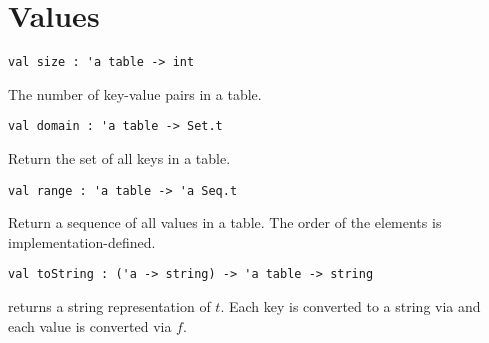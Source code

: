 \section{Values}
\label{sec:table-interface::values}

\begin{cluster}
\label{grp:grm:table-interface::size}

\begin{gram}[size]
\label{grm:table-interface::size}
\begin{verbatim}
val size : 'a table -> int
\end{verbatim}
The number of key-value pairs in a table.

\end{gram}
\end{cluster}

\begin{cluster}
\label{grp:grm:table-interface::domain}

\begin{gram}[domain]
\label{grm:table-interface::domain}
\begin{verbatim}
val domain : 'a table -> Set.t
\end{verbatim}
Return the set of all keys in a table.

\end{gram}
\end{cluster}

\begin{cluster}
\label{grp:grm:table-interface::range}

\begin{gram}[range]
\label{grm:table-interface::range}
\begin{verbatim}
val range : 'a table -> 'a Seq.t
\end{verbatim}
Return a sequence of all values in a table. The order of the elements is
implementation-defined.

\end{gram}
\end{cluster}

\begin{cluster}
\label{grp:grm:table-interface::tostring}

\begin{gram}[toString]
\label{grm:table-interface::tostring}
\begin{verbatim}
val toString : ('a -> string) -> 'a table -> string
\end{verbatim}
 returns a string representation of $t$. Each key is converted
to a string via  and each value is converted via $f$.

\end{gram}
\end{cluster}

